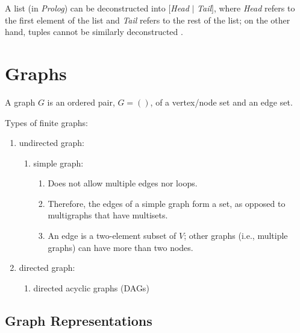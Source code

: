 A list (in {\it Prolog}) can be deconstructed into $[${\it Head} $|$ {\it Tail}$]$, where {\it Head} refers to the first element of the list and {\it Tail} refers to the rest of the list; on the other hand, tuples cannot be similarly deconstructed \cite[\S4.3 pp. 113]{Tate2010}.





\section{Graphs}
\label{sec:Graphs}

A graph $G$ is an ordered pair, $G = ()$, of a vertex/node set and an edge set.

Types of finite graphs: \vspace{-0.3cm}
\begin{enumerate} \itemsep -4pt
\item undirected graph: \vspace{-0.3cm}
	\begin{enumerate} \itemsep -2pt
	\item simple graph: \vspace{-0.2cm}
		\begin{enumerate} \itemsep -2pt
		\item Does not allow multiple edges nor loops.
		\item Therefore, the edges of a simple graph form a set, as opposed to multigraphs that have multisets.
		\item An edge is a two-element subset of $V$; other graphs (i.e., multiple graphs) can have more than two nodes.
		\end{enumerate}
	\end{enumerate}
\item directed graph: \vspace{-0.3cm}
	\begin{enumerate} \itemsep -2pt
	\item directed acyclic graphs (DAGs)
	\end{enumerate}
\end{enumerate}


\subsection{Graph Representations}
\label{ssec:GraphRepresentations}

